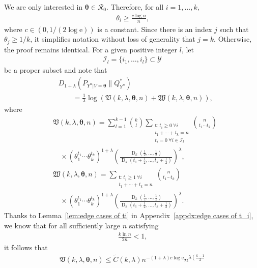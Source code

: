 \documentclass[journal, 10pt]{IEEEtran}
\newcommand{\rme}{\mathrm{e}}
\newcommand{\cI}{\mathcal{I}}
\newcommand{\cR}{\mathcal{R}}
\newcommand{\cY}{\mathcal{Y}}
\newcommand{\mfrakV}{\mathfrak{V}}
\newcommand{\mfrakW}{\mathfrak{W}}
\theoremstyle{plain}
\theoremstyle{plain}
\theoremstyle{plain}
\theoremstyle{plain}
\newcommand{\boldtheta}{\mathbold{\theta}}
\newcommand{\boldt}{\mathbold{t}}
\newcommand{\opD}{\operatorname{D}}
\begin{document}
\begin{IEEEproof}
We are only interested in $\boldtheta \in \cR_0$. Therefore, for all $i=1, \hdots, k $,
\begin{align}
	\theta_i \ge \frac{c\log n}{n}\text{,}
\end{align}
where $c \in (0, 1/(2\log \rme))$ is a constant. Since there is an index $j$ such that $\theta_j\ge 1/k$, it simplifies notation without loss of generality that $j=k$. Otherwise, the proof remains identical. For a given positive integer $l$, let
\begin{align}
	\cI_l=\{i_1,\hdots, i_l \}\subset \cY
\end{align}
be a proper subset and note that
\begin{align}
&D_{1+\lambda}(P_{Y^n|V=\boldtheta}\| Q_{Y^n}^\ast) \nonumber \\
&\qquad =
\frac{1}{\lambda} \log( \mfrakV(k, \lambda, \boldtheta, n) + \mfrakW(k, \lambda, \boldtheta, n))\text{,} \label{aqzu}
\end{align}
where
\begin{align}
&\mfrakV(k, \lambda, \boldtheta, n)
= \sum_{l=1}^{k-1}\binom{k}{l} \sum_{\substack{\boldt \colon t_i \ge 0 \ \forall i \\ t_1+\cdots+ t_k=n \\  t_i=0 \ \forall i \in \cI_l}} \binom{n}{t_1 \cdots t_k}  \label{eqn:def:frakV-general} \\ 
&\quad \times (\theta_1^{t_1} \cdots \theta_k^{t_k})^{1+\lambda} \left( \frac{\opD_k(\frac12, \hdots, \frac12)}{\opD_k(t_1+\frac12, \hdots, t_k+\frac12)} \right)^\lambda  \text{,} \nonumber\\
&\mfrakW(k, \lambda, \boldtheta, n)=
\sum_{\substack{\boldt \colon t_i \ge 1 \ \forall i \\ t_1+\cdots+ t_k=n }} \binom{n}{t_1 \cdots t_k} \label{eqn:def:frakW-general}\\ 
&\quad \times (\theta_1^{t_1} \cdots \theta_k^{t_k})^{1+\lambda} \left(\frac{\opD_k(\frac12, \hdots, \frac12)}{\opD_k(t_1+\frac12, \hdots, t_k+\frac12)} \right)^\lambda\text{.}  \nonumber
\end{align}
Thanks to Lemma~\ref{lem:edge cases of ti} in Appendix~\ref{appdx:edge cases of t_i}, we know that for all sufficiently large $n$ satisfying
\begin{align}
	\frac{k\ln n}{2n}<1\text{,}
\end{align}
it follows that
\begin{align}
\mfrakV(k, \lambda, \boldtheta, n) \le \widetilde{C}(k,\lambda) n^{-(1+\lambda)c\log \rme } n^{\lambda \left(\frac{k-1}{2} 
}
\end{align}
\end{IEEEproof}
\end{document}
